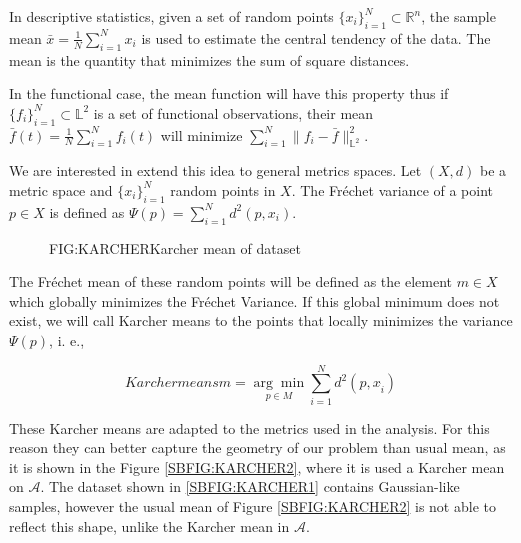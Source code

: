 In descriptive statistics, given a set of random points
$\{x_i\}_{i=1}^{N} \subset \mathbb{R}^n$, the sample mean
$\bar x = \frac{1}{N}\sum_{i=1}^{N} x_i$ is used to estimate the central
tendency of the data. The mean is the quantity that minimizes the sum of square distances.

In the functional case, the mean function will have this property thus if
$\{f_i\}_{i=1}^{N} \subset \mathbb{L}^2$ is a set of functional observations,
their mean $\bar f(t) = \frac{1}{N}\sum_{i=1}^{N} f_i(t)$ will minimize
$\sum_{i=1}^{N}\|f_i - \bar f\|_{\mathbb{L}^2}^2$.

We are interested in extend this idea to general metrics spaces.
Let $(X, d)$ be a metric space and $\{x_i\}_{i=1}^{N}$ random points in $X$.
The Fréchet variance of a point $p \in X$ is defined as $\Psi(p)=\sum_{i=1}^{N} d^{2}\left(p, x_{i}\right)$.

\begin{figure}[Karcher mean of dataset]{FIG:KARCHER}{Karcher mean of dataset}
	 \quad
	 \\
	 \quad
\end{figure}

The Fréchet mean of these random points will be defined as the element $m \in X$
which globally minimizes the Fréchet Variance. If this global minimum does not
exist, we will call Karcher means to the points that locally minimizes the variance
$\Psi(p)$, i. e.,

\begin{equation}[]{Karcher means}
m=\underset{p \in M}{\arg \min } \sum_{i=1}^{N} d^{2}\left(p, x_{\dot{i}}\right)
\end{equation}

These Karcher means are adapted to the metrics used in the analysis. For this reason they can better capture the geometry of our problem
than usual mean, as it is shown in the Figure \ref{SBFIG:KARCHER2}, where it is
used a Karcher mean on $\mathscr{A}$.
The dataset shown in \ref{SBFIG:KARCHER1} contains Gaussian-like
samples, however the usual mean of Figure \ref{SBFIG:KARCHER2} is not able to reflect
this shape, unlike the Karcher mean in $\mathscr{A}$.



